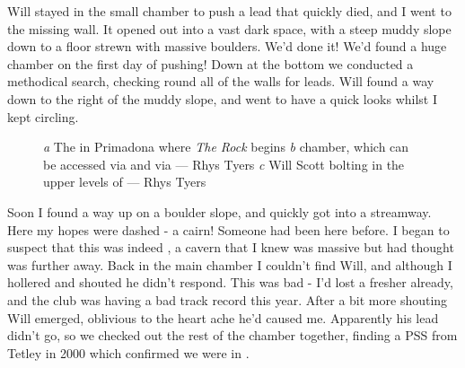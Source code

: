 Will stayed in the small chamber to push a lead that quickly died, and I went to the missing wall. It opened out into a vast dark space, with a steep muddy slope down to a floor strewn with massive boulders. We’d done it! We’d found a huge chamber on the first day of pushing! Down at the bottom we conducted a methodical search, checking round all of the walls for leads. Will found a way down to the right of the muddy slope, and went to have a quick looks whilst I kept circling.

\begin{figure}[t!]
	\checkoddpage \ifoddpage \forcerectofloat \else \forceversofloat \fi
	\centering
	
   	\begin{subfigure}[t]{0.49\textwidth}
    	\centering
       	\caption{} \label{The spiral climb}
    \end{subfigure}
    \hfill
	\begin{subfigure}[t]{0.49\textwidth}
		\centering
		 \caption{}\label{Alkatraz}
	\end{subfigure}
    \vspace{0cm}
	
	\begin{subfigure}[h]{\textwidth}
		\centering
		\caption{}\label{WS bolting}
	\end{subfigure}

         \caption{
   		\emph{a} The \protect{} in Primadona where \emph{The Rock} begins
     		\emph{b} \protect{} chamber, which can be accessed via \protect{} and \protect{} via \protect{} --- Rhys Tyers 
     		\emph{c} Will Scott bolting in the upper levels of \protect{} --- Rhys Tyers
		}
\end{figure}

Soon I found a way up on a boulder slope, and quickly got into a streamway. Here my hopes were dashed - a cairn! Someone had been here before. I began to suspect that this was indeed , a cavern that I knew was massive but had thought was further away. Back in the main chamber I couldn’t find Will, and although I hollered and shouted he didn’t respond. This was bad - I’d lost a fresher already, and the club was having a bad track record this year. After a bit more shouting Will emerged, oblivious to the heart ache he’d caused me. Apparently his lead didn’t go, so we checked out the rest of the chamber together, finding a PSS from Tetley in 2000 which confirmed we were in .

